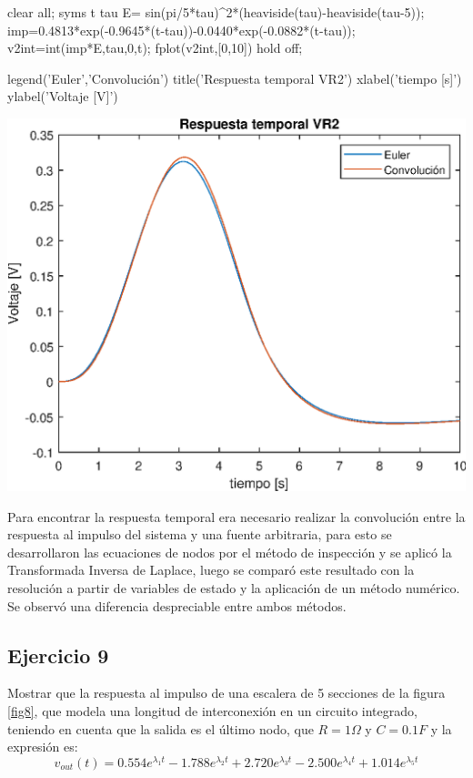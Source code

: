 \documentclass[10pt,a4paper]{article} %
\begin{document}
		\begin{matlabcode}
		clear all;
		syms t tau  
		E= sin(pi/5*tau)^2*(heaviside(tau)-heaviside(tau-5));
		imp=0.4813*exp(-0.9645*(t-tau))-0.0440*exp(-0.0882*(t-tau));
		v2int=int(imp*E,tau,0,t);
		fplot(v2int,[0,10])
		hold off;
		
		legend({'Euler','Convolución'})
		title('Respuesta temporal VR2')
		xlabel('tiempo [s]')
		ylabel('Voltaje [V]')
		\end{matlabcode}
		\begin{center}
		\includegraphics[width=\maxwidth{56.196688409433015em}]{figure_0_08}
		\end{center}
		
		Para encontrar la respuesta temporal era necesario realizar la convolución entre la respuesta al impulso del sistema y una fuente arbitraria, para esto se desarrollaron las ecuaciones de nodos por el método de inspección y se aplicó la Transformada Inversa de Laplace, luego se comparó este resultado con la resolución a partir de variables de estado y la aplicación de un método numérico. Se observó una diferencia despreciable entre ambos métodos.\\
	\subsection{Ejercicio 9} Mostrar que la respuesta al impulso de una escalera de 5 secciones de la figura \ref{fig8}, que modela una longitud de interconexión en un circuito integrado, teniendo en cuenta que la salida es el último nodo, que $R=1\Omega$ y $C=0.1F$ y la expresión es:
	\begin{equation}
		v_{out}(t)=0.554e^{\lambda_1 t}-1.788e^{\lambda_2 t}+2.720e^{\lambda_3 t}-2.500e^{\lambda_4 t}+1.014e^{\lambda_5 t}
	\end{equation}
	
\end{document}
